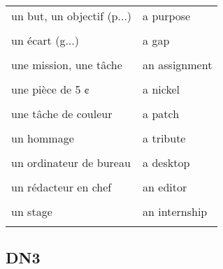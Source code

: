 \documentclass[
  10pt,
]{article}
\begin{document}
\begin{longtable}{ll}
un but, un objectif (p...) & a purpose\\

\cellcolor{gray!6}{un écart (d...)} & \cellcolor{gray!6}{a discrepancy}\\

un écart (g...) & a gap\\

\cellcolor{gray!6}{une légende d'image} & \cellcolor{gray!6}{a caption}\\

une mission, une tâche & an assignment\\

\cellcolor{gray!6}{une pièce de 25 ¢} & \cellcolor{gray!6}{a quarter}\\

une pièce de 5 ¢ & a nickel\\

\cellcolor{gray!6}{une pièce de 10 ¢} & \cellcolor{gray!6}{a dime}\\

une tâche de couleur & a patch\\

\cellcolor{gray!6}{une vue d'ensemble} & \cellcolor{gray!6}{an overview}\\

un hommage & a tribute\\

\cellcolor{gray!6}{un indice} & \cellcolor{gray!6}{a clue}\\

un ordinateur de bureau & a desktop\\

\cellcolor{gray!6}{un ordinateur portable} & \cellcolor{gray!6}{a laptop}\\

un rédacteur en chef & an editor\\

\cellcolor{gray!6}{un sondage} & \cellcolor{gray!6}{a poll}\\

un stage & an internship\\

\cellcolor{gray!6}{vendre la mèche} & \cellcolor{gray!6}{to spill the beans}\\
\bottomrule
\end{longtable}

\hypertarget{dn3}{%
\subsection{DN3}\label{dn3}}
\end{document}
